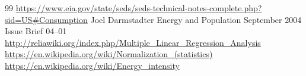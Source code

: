 \documentclass{mcmthesis}
\begin{document}
\begin{thebibliography} {99}
  \url{https://www.eia.gov/state/seds/seds-technical-notes-complete.php?sid=US#Consumption}
   Joel Darmstadter  Energy and Population September 2004 Issue Brief 04–01
  \url{http://reliawiki.org/index.php/Multiple_Linear_Regression_Analysis}
  \url{https://en.wikipedia.org/wiki/Normalization_(statistics)}
  \url{https://en.wikipedia.org/wiki/Energy_intensity}
\end{thebibliography}
\end{document}
